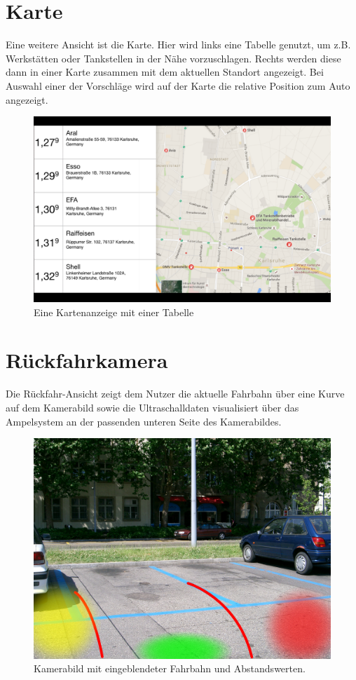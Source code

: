 \documentclass[pflichtenheft.tex]{subfiles}
\begin{document}
\clearpage
\section{Karte}
\label{sec:Karte}

Eine weitere Ansicht ist die Karte. Hier wird links eine Tabelle genutzt, um z.B. Werkstätten oder Tankstellen in der Nähe vorzuschlagen. Rechts werden diese dann in einer Karte zusammen mit dem aktuellen Standort angezeigt.
Bei Auswahl einer der Vorschläge wird auf der Karte die relative Position zum Auto angezeigt.
\begin{figure}[H]
  	\begin{center}
 		\includegraphics[width=\textwidth]{Images/GUI-Map.png}
  		\caption{Eine Kartenanzeige mit einer Tabelle}
  	\end{center}
\end{figure}

\clearpage
\section{Rückfahrkamera}

Die Rückfahr-Ansicht zeigt dem Nutzer die aktuelle Fahrbahn über eine Kurve auf dem Kamerabild sowie die Ultraschalldaten visualisiert über das Ampelsystem an der passenden unteren Seite des Kamerabildes.

\begin{figure}[H]
  	\begin{center}
 		\includegraphics[width=\textwidth]{Images/GUI-BackDrive.jpg}
  		\caption{Kamerabild mit eingeblendeter Fahrbahn und Abstandswerten.}
  	\end{center}
\end{figure}
\end{document}

